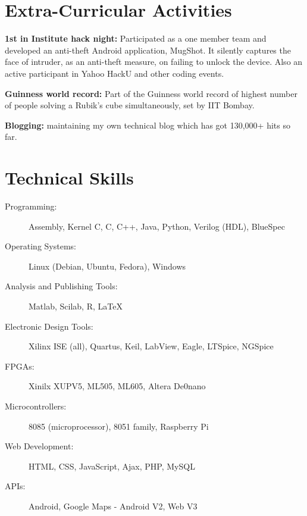 \documentclass[margin,line]{resume}
\begin{document}
\begin{resume}
\section{\mysidestyle Extra-Curricular Activities}
\begin{list1}
\item {\bf 1st in Institute hack night:} Participated as a one member team and developed an anti-theft Android application, MugShot. It silently captures the face of intruder, as an anti-theft measure, on failing to unlock the device. Also an active participant in Yahoo HackU and other coding events.
\item {\bf Guinness world record:} Part of the Guinness world record of highest number of people solving a Rubik’s cube simultaneously, set by IIT Bombay.
\item {\bf Blogging:} maintaining my own technical blog which has got 130,000+ hits so far.
\end{list1}

	

\section{\mysidestyle Technical Skills}
\vspace{0mm}
	\begin{description}
	\item [Programming:] {Assembly, Kernel C, C, C++, Java, Python, Verilog (HDL), BlueSpec}
	\item [Operating Systems:] {Linux (Debian, Ubuntu, Fedora), Windows}
	\item [Analysis and Publishing Tools:] {Matlab, Scilab, R, \LaTeX}
	\item [Electronic Design Tools:] {Xilinx ISE (all), Quartus, Keil, LabView, Eagle, LTSpice, NGSpice}
	\item [FPGAs:] Xinilx XUPV5, ML505, ML605, Altera De0nano
	\item [Microcontrollers:] 8085 (microprocessor), 8051 family, Raspberry Pi
	\item [Web Development:] HTML, CSS, JavaScript, Ajax, PHP, MySQL
	\item [APIs:] Android, Google Maps - Android V2, Web V3
	\end {description}



\end{resume}
\end{document}
